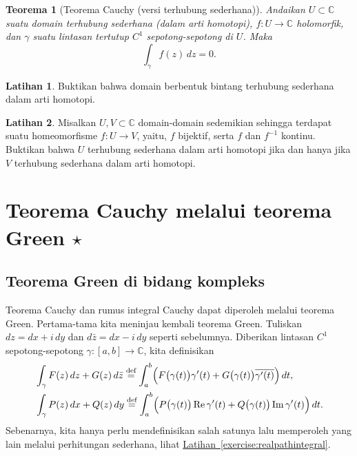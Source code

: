 \documentclass[12pt,openany]{book}
\renewcommand{\Re}{\operatorname{Re}}
\renewcommand{\Im}{\operatorname{Im}}
\newcommand{\C}{{\mathbb{C}}}
\theoremstyle{plain}
\newtheorem{thm}{Teorema}[section]
\theoremstyle{remark}
\theoremstyle{definition}
\newenvironment{exbox}{%
    \def\FrameCommand{\vrule width 1pt \relax\hspace{10pt}}%
    \MakeFramed{\advance\hsize-\width\FrameRestore}%
}{%
    \endMakeFramed
}
\theoremstyle{exercise}
\newtheorem{exercise}{Latihan}[section]
\theoremstyle{example}
\newcommand{\exerciseref}[1]{\hyperref[#1]{Latihan~\ref*{#1}}}
\begin{document}
\begin{thm}[Teorema Cauchy (versi terhubung sederhana)]
%
Andaikan $U \subset \C$ suatu domain terhubung sederhana (dalam arti
homotopi), $f \colon U \to \C$ holomorfik,
dan $\gamma$ suatu lintasan tertutup $C^1$ sepotong-sepotong di $U$. Maka
\begin{equation*}
\int_{\gamma} f(z) \, dz = 0 .
\end{equation*}
\end{thm}

\begin{exbox}
\begin{exercise}
Buktikan bahwa domain berbentuk bintang terhubung sederhana dalam arti homotopi.
\end{exercise}

\begin{exercise}
Misalkan $U,V \subset \C$ domain-domain sedemikian sehingga
terdapat suatu homeomorfisme
$f \colon U \to V$, yaitu, $f$ bijektif, serta $f$ dan $f^{-1}$
kontinu. Buktikan bahwa $U$ terhubung sederhana dalam arti homotopi jika
dan hanya jika $V$ terhubung sederhana dalam arti homotopi.
\end{exercise}
\end{exbox}


\section{Teorema Cauchy melalui teorema Green \texorpdfstring{$\star$}{*}}

\subsection{Teorema Green di bidang kompleks}

Teorema Cauchy dan rumus integral Cauchy dapat diperoleh melalui 
teorema Green.
Pertama-tama kita meninjau kembali teorema Green.
Tuliskan $dz = dx + i\, dy$ dan $d\bar{z} = dx - i \, dy$ seperti sebelumnya.
Diberikan lintasan $C^1$ sepotong-sepotong $\gamma \colon [a,b] \to \C$, kita definisikan
\begin{align*}
& \int_\gamma
F(z) \, dz + G(z) \, d\bar{z}
\overset{\text{def}}{=}
\int_a^b 
\Bigl(F\bigl(\gamma(t)\bigr) \gamma'(t) + G\bigl(\gamma(t)\bigr)
\overline{\gamma'(t)} \Bigr) \, dt ,
\\
& \int_\gamma
P(z) \, dx + Q(z) \, dy
\overset{\text{def}}{=}
\int_a^b 
\Bigl(P\bigl(\gamma(t)\bigr) \Re \gamma'(t) + Q\bigl(\gamma(t)\bigr) \Im
\gamma'(t) \Bigr) \, dt .
\end{align*}
Sebenarnya, kita hanya perlu mendefinisikan salah satunya lalu memperoleh yang lain melalui perhitungan
sederhana, lihat \exerciseref{exercise:realpathintegral}.
\end{document}
